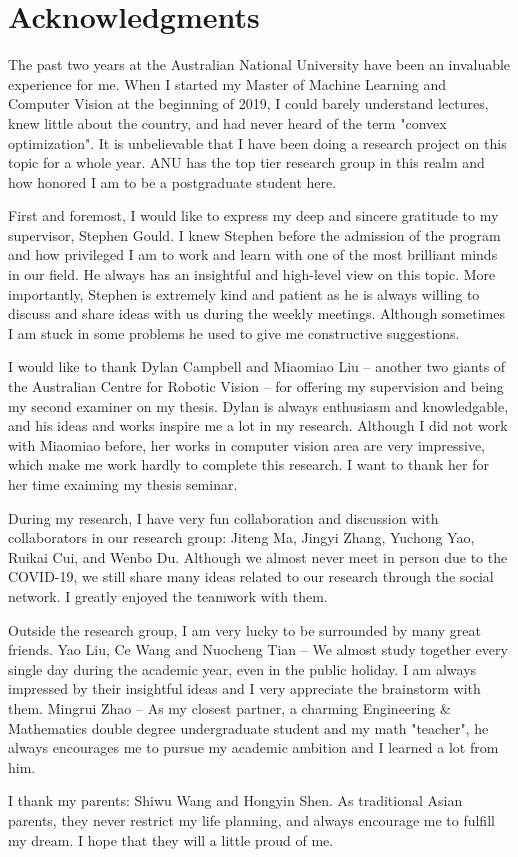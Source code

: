 \chapter*{Acknowledgments}
The past two years at the Australian National University have been an invaluable experience for me. When I started my Master of Machine Learning and Computer Vision at the beginning of 2019, I could barely understand lectures, knew little about the country, and had never heard of the term "convex optimization". It is unbelievable that I have been doing a research project on this topic for a whole year. ANU has the top tier research group in this realm and how honored I am to be a postgraduate student here. 
\par First and foremost, I would like to express my deep and sincere gratitude to my supervisor, Stephen Gould. I knew Stephen before the admission of the program and how privileged I am to work and learn with one of the most brilliant minds in our field. He always has an insightful and high-level view on this topic. More importantly, Stephen is extremely kind and patient as he is always willing to discuss and share ideas with us during the weekly meetings. Although sometimes I am stuck in some problems he used to give me constructive suggestions. 
\par I would like to thank Dylan Campbell and Miaomiao Liu -- another two giants of the Australian Centre for Robotic Vision -- for offering my supervision and being my second examiner on my thesis. Dylan is always enthusiasm and knowledgable, and his ideas and works inspire me a lot in my research. Although I did not work with Miaomiao before, her works in computer vision area are very impressive, which make me work hardly to complete this research. I want to thank her for her time exaiming my thesis seminar. 
\par During my research, I have very fun collaboration and discussion with collaborators in our research group: Jiteng Ma, Jingyi Zhang, Yuchong Yao, Ruikai Cui, and Wenbo Du. Although we almost never meet in person due to the COVID-19, we still share many ideas related to our research through the social network. I greatly enjoyed the teamwork with them.
\par Outside the research group, I am very lucky to be surrounded by many great friends. Yao Liu, Ce Wang and Nuocheng Tian -- We almost study together every single day during the academic year, even in the public holiday. I am always impressed by their insightful ideas and I very appreciate the brainstorm with them. Mingrui Zhao -- As my closest partner, a charming Engineering \& Mathematics double degree undergraduate student and my math "teacher", he always encourages me to pursue my academic ambition and I learned a lot from him. 
\par I thank my parents: Shiwu Wang and Hongyin Shen. As traditional Asian parents, they never restrict my life planning, and always encourage me to fulfill my dream. I hope that they will a little proud of me. 